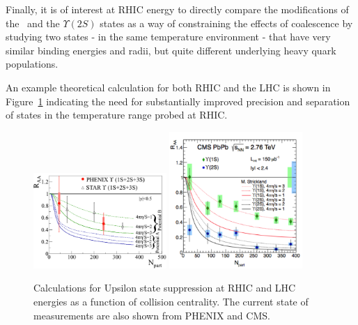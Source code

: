 Finally, it is of interest at RHIC energy to directly compare the modifications of the 
\jpsi~and the $\Upsilon(2S)$ states as a way of constraining the effects of
coalescence by studying two states - in the same temperature environment - that have very similar binding energies and 
radii, but quite different underlying heavy quark populations. 

 An example theoretical calculation for both RHIC and the LHC is shown
in Figure~\ref{fig:upsilon_theory} indicating the need for substantially
improved precision and separation of states in the temperature range probed at RHIC.

\begin{figure}
  \begin{center}
    \includegraphics[width=0.45\textwidth, height=0.38\textwidth]{figs/STAR_PHENIX_upsilon_RAA_strickland_curves}
    \hfill
    \includegraphics[width=0.45\textwidth, height=0.4\textwidth]{figs/CMS_upsilon_raa_strickland_curves}
  \end{center}
  \caption[ Calculations for Upsilon state suppression at RHIC and LHC
  energies vs collision centrality]{\label{fig:upsilon_theory}
    Calculations for Upsilon state suppression at RHIC and LHC
    energies as a function of collision centrality.  The current state
    of measurements are also shown from PHENIX and CMS.}
\end{figure}


